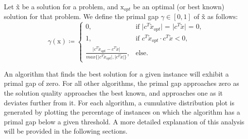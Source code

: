 \begin{definition}
	\label{def:primalgap}
	Let \~x be a solution for a problem, and $\text{\~x}_{opt}$ be an optimal (or best known)
	solution for that problem. We define the primal gap $\gamma \in \left[0, 1\right]$ of \~x as follows:
	\begin{equation*}
		\gamma\left(\text{\~x}\right)\coloneqq\begin{cases}
			0,                                                                                                                            & \text{if $\lvert c^T\tilde{x}_{opt}\rvert$ = $\lvert c^T\tilde{x}\rvert$ = 0}, \\
			1,                                                                                                                            & \text{if $c^T\tilde{x}_{opt} \cdot c^T\tilde{x} < 0$},                         \\
			\frac{\lvert c^T\tilde{x}_{opt} - c^T\tilde{x} \rvert}{max \{\lvert c^T\tilde{x}_{opt} \rvert, \lvert c^T\tilde{x} \rvert\}}, & \text{else}.
		\end{cases}
	\end{equation*}
\end{definition}

An algorithm that finds the best solution for a given instance will exhibit a primal gap of zero.
For all other algorithms, the primal gap approaches zero as the solution quality approaches the best known,
and approaches one as it deviates further from it.
For each algorithm, a cumulative distribution plot is generated by plotting the percentage of instances
on which the algorithm has a primal gap below a given threshold. A more detailed explanation of this analysis will be provided in the following sections.
